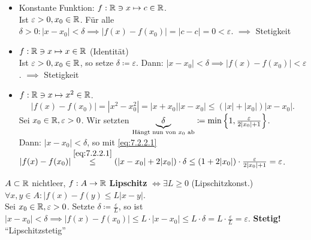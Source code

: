 \begin{subexample}
	\begin{itemize}
		\item Konstante Funktion: $ f: \mathbb{R}  \ni x \mapsto c \in \mathbb{R}  $.\\
			Ist $ \varepsilon > 0, x_0 \in \mathbb{R}  $. Für alle $ \delta > 0 : \left| x - x_0 \right| < \delta \implies \left| f(x) - f(x_0) \right| = \left| c - c \right| = 0 < \varepsilon  $. $ \implies  $ Stetigkeit
		\item $ f: \mathbb{R}  \ni x \mapsto x \in \mathbb{R}  $ (Identität)\\
			Ist $ \varepsilon > 0, x_0 \in \mathbb{R} $, so setze $ \delta \coloneqq \varepsilon  $. Dann: $ \left| x - x_0 \right| < \delta \implies \left| f(x) - f(x_0) \right| < \varepsilon  $. $ \implies  $ Stetigkeit
		\item $ f: \mathbb{R}  \ni x \mapsto x^2 \in \mathbb{R}  $.\\
			\begin{equation}
				\left| f(x) - f(x_0) \right| = \left| x^2 - x_0^2 \right| = \left| x + x_0 \right| \left| x - x_0 \right| \leq ( | x | + | x_0 | ) | x - x_0 |.
				\label{eq:7.2.2.1}
			\end{equation}
			Sei $ x_0 \in \mathbb{R} , \varepsilon > 0 $. Wir setzten $ \underbrace{\delta}_{\text{Hängt nun von $ x_0 $ ab} } \coloneqq \min \left\{ 1, \frac{ \varepsilon  }{ 2|x_0| + 1 }  \right\}  $.\\
			Dann: $ | x - x_0 | < \delta $, so mit \eqref{eq:7.2.2.1}\\
			$ | f(x) - f(x_0) | \overset{\eqref{eq:7.2.2.1}}{\leq } \left( | x - x_0 | + 2|x_0| \right) \cdot \delta \leq ( 1 + 2|x_0|) \cdot  \frac{ \varepsilon  }{ 2|x_0| + 1 } = \varepsilon  $.
	\end{itemize}
\end{subexample}

\begin{subexample}
	$ A\subset \mathbb{R}  $ nichtleer, $ f: A \to \mathbb{R}  $ \textbf{Lipschitz} $ \iff \exists L \geq  0 $ (Lipschitzkonst.) $ \forall x, y \in A: | f(x) - f(y) \leq  L|x - y| $.\\
	Sei $ x_0 \in \mathbb{R} , \varepsilon > 0 $. Setzte $ \delta \coloneqq \frac{ \varepsilon  }{ L }  $, so ist $ | x - x_0 | < \delta \implies |f(x) - f(x_0)| \leq L \cdot | x - x_0 | \leq  L \cdot \delta = L \cdot \frac{ \varepsilon  }{ L } = \varepsilon $. \textbf{Stetig!} ``Lipschitzstetig''
\end{subexample}

